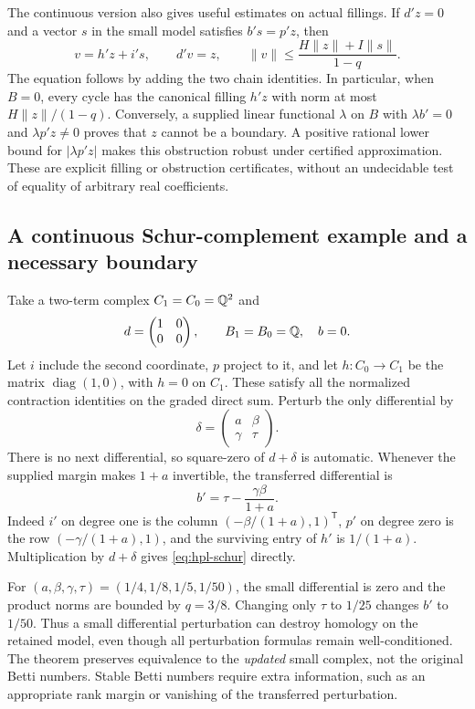 The continuous version also gives useful estimates on actual fillings.
If $d'z=0$ and a vector $s$ in the small model satisfies $b's=p'z$, then
\[
 v=h'z+i's,\qquad d'v=z,
 \qquad
 \|v\|\le\frac{H\|z\|+I\|s\|}{1-q}.
\]
The equation follows by adding the two chain identities.  In particular,
when $B=0$, every cycle has the canonical filling $h'z$ with norm at most
$H\|z\|/(1-q)$.  Conversely, a supplied linear functional $\lambda$ on
$B$ with $\lambda b'=0$ and $\lambda p'z\ne0$ proves that $z$ cannot be a
boundary.  A positive rational lower bound for $|\lambda p'z|$ makes this
obstruction robust under certified approximation.  These are explicit
filling or obstruction certificates, without an undecidable test of equality
of arbitrary real coefficients.

\subsection{A continuous Schur-complement example and a necessary boundary}

Take a two-term complex $C_1=C_0=\mathbb Q^2$ and
\[
 d=\begin{pmatrix}1&0\\0&0\end{pmatrix},\qquad
 B_1=B_0=\mathbb Q,\quad b=0.
\]
Let $i$ include the second coordinate, $p$ project to it, and let
$h:C_0\to C_1$ be the matrix $\operatorname{diag}(1,0)$, with $h=0$ on
$C_1$.  These satisfy all the normalized contraction identities on the
graded direct sum.  Perturb the only differential by
\[
 \delta=\begin{pmatrix}a&\beta\\\gamma&\tau\end{pmatrix}.
\]
There is no next differential, so square-zero of $d+\delta$ is automatic.
Whenever the supplied margin makes $1+a$ invertible, the transferred
differential is
\begin{equation}
 b'=\tau-\frac{\gamma\beta}{1+a}.
 \label{eq:hpl-schur}
\end{equation}
Indeed $i'$ on degree one is the column
$(-\beta/(1+a),1)^{\mathsf T}$, $p'$ on degree zero is the row
$(-\gamma/(1+a),1)$, and the surviving entry of $h'$ is $1/(1+a)$.
Multiplication by $d+\delta$ gives \eqref{eq:hpl-schur} directly.

For $(a,\beta,\gamma,\tau)=(1/4,1/8,1/5,1/50)$, the small differential
is zero and the product norms are bounded by $q=3/8$.  Changing only
$\tau$ to $1/25$ changes $b'$ to $1/50$.  Thus a small differential
perturbation can destroy homology on the retained model, even though all
perturbation formulas remain well-conditioned.  The theorem preserves
equivalence to the \emph{updated} small complex, not the original Betti
numbers.  Stable Betti numbers require extra information, such as an
appropriate rank margin or vanishing of the transferred perturbation.

